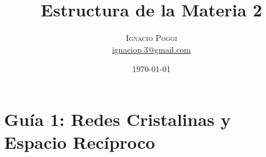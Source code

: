 \documentclass[a4paper]{article}
\title{Estructura de la Materia 2} %
\author{%
\textsc{Ignacio Poggi} \\[1ex] %
\normalsize \href{mailto:ignaciop.3@gmail.com}{ignaciop.3@gmail.com} %
}
\date{\today} %
\begin{document}
\maketitle



\section{Gu\'ia 1: Redes Cristalinas y Espacio Rec\'iproco}

\subsection{}
\end{document}
